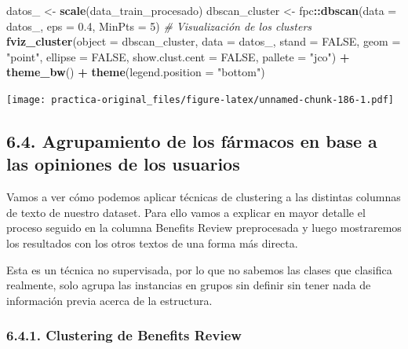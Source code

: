 \documentclass[spanish,]{article}
\newenvironment{Shaded}{\begin{snugshade}}{\end{snugshade}}
\newcommand{\KeywordTok}[1]{\textcolor[rgb]{0.13,0.29,0.53}{\textbf{#1}}}
\newcommand{\DataTypeTok}[1]{\textcolor[rgb]{0.13,0.29,0.53}{#1}}
\newcommand{\DecValTok}[1]{\textcolor[rgb]{0.00,0.00,0.81}{#1}}
\newcommand{\FloatTok}[1]{\textcolor[rgb]{0.00,0.00,0.81}{#1}}
\newcommand{\StringTok}[1]{\textcolor[rgb]{0.31,0.60,0.02}{#1}}
\newcommand{\CommentTok}[1]{\textcolor[rgb]{0.56,0.35,0.01}{\textit{#1}}}
\newcommand{\OtherTok}[1]{\textcolor[rgb]{0.56,0.35,0.01}{#1}}
\newcommand{\OperatorTok}[1]{\textcolor[rgb]{0.81,0.36,0.00}{\textbf{#1}}}
\newcommand{\NormalTok}[1]{#1}
\begin{document}
\begin{Shaded}
\begin{Highlighting}[]
\NormalTok{datos_ <-}\StringTok{ }\KeywordTok{scale}\NormalTok{(data_train_procesado)}
\NormalTok{dbscan_cluster <-}\StringTok{ }\NormalTok{fpc}\OperatorTok{::}\KeywordTok{dbscan}\NormalTok{(}\DataTypeTok{data =}\NormalTok{ datos_, }\DataTypeTok{eps =} \FloatTok{0.4}\NormalTok{, }\DataTypeTok{MinPts =} \DecValTok{5}\NormalTok{)}
\CommentTok{# Visualización de los clusters}
\KeywordTok{fviz_cluster}\NormalTok{(}\DataTypeTok{object =}\NormalTok{ dbscan_cluster, }\DataTypeTok{data =}\NormalTok{ datos_, }\DataTypeTok{stand =} \OtherTok{FALSE}\NormalTok{,}
             \DataTypeTok{geom =} \StringTok{"point"}\NormalTok{, }\DataTypeTok{ellipse =} \OtherTok{FALSE}\NormalTok{, }\DataTypeTok{show.clust.cent =} \OtherTok{FALSE}\NormalTok{,}
             \DataTypeTok{pallete =} \StringTok{"jco"}\NormalTok{) }\OperatorTok{+}
\StringTok{  }\KeywordTok{theme_bw}\NormalTok{() }\OperatorTok{+}
\StringTok{  }\KeywordTok{theme}\NormalTok{(}\DataTypeTok{legend.position =} \StringTok{"bottom"}\NormalTok{)}
\end{Highlighting}
\end{Shaded}

\texttt{[image: practica-original\_files/figure-latex/unnamed-chunk-186-1.pdf]}

\subsection{6.4. Agrupamiento de los fármacos en base a las opiniones de
los
usuarios}\label{agrupamiento-de-los-farmacos-en-base-a-las-opiniones-de-los-usuarios}

Vamos a ver cómo podemos aplicar técnicas de clustering a las distintas
columnas de texto de nuestro dataset. Para ello vamos a explicar en
mayor detalle el proceso seguido en la columna Benefits Review
preprocesada y luego mostraremos los resultados con los otros textos de
una forma más directa.

Esta es un técnica no supervisada, por lo que no sabemos las clases que
clasifica realmente, solo agrupa las instancias en grupos sin definir
sin tener nada de información previa acerca de la estructura.

\subsubsection{6.4.1. Clustering de Benefits
Review}\label{clustering-de-benefits-review}
\end{document}
